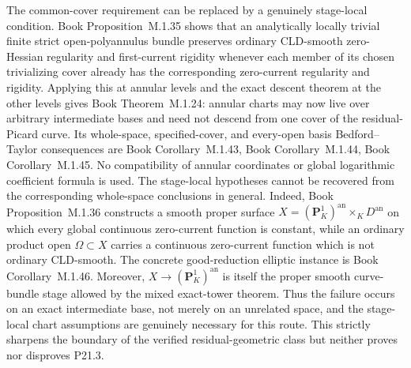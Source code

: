 \documentclass[11pt,a4paper]{article}
\theoremstyle{definition}
\theoremstyle{remark}
\begin{document}
The common-cover requirement can be replaced by a genuinely stage-local
condition.  Book Proposition~M.1.35
shows that
an analytically locally trivial finite strict open-polyannulus bundle
preserves ordinary CLD-smooth zero-Hessian regularity and first-current
rigidity whenever each member of its chosen trivializing cover already has
the corresponding zero-current regularity and rigidity.  Applying this at
annular levels and the exact descent theorem at the other levels gives
Book Theorem~M.1.24: annular charts may
now live over arbitrary intermediate bases and need not descend from one
cover of the residual-Picard curve.  Its whole-space, specified-cover, and
every-open basis Bedford--Taylor consequences are
Book Corollary~M.1.43, Book Corollary~M.1.44, Book Corollary~M.1.45.
No compatibility of annular coordinates or global logarithmic coefficient
formula is used.  The stage-local hypotheses cannot be recovered from the
corresponding whole-space conclusions in general.  Indeed,
Book Proposition~M.1.36 constructs a
smooth proper surface \(X=(\mathbf P^1_K)^{\mathrm{an}}\times_KD^{\mathrm{an}}\)
on which every global continuous zero-current function is constant, while
an ordinary product open \(\Omega\subset X\) carries a continuous
zero-current function which is not ordinary CLD-smooth.  The concrete
good-reduction elliptic instance is
Book Corollary~M.1.46.  Moreover,
\(X\to(\mathbf P^1_K)^{\mathrm{an}}\) is itself the proper smooth curve-bundle
stage allowed by the mixed exact-tower theorem.  Thus the failure occurs on
an exact intermediate base, not merely on an unrelated space, and the
stage-local chart assumptions are genuinely necessary for this route.
This strictly sharpens the boundary of the verified residual-geometric
class but neither proves nor disproves P21.3.
\end{document}

